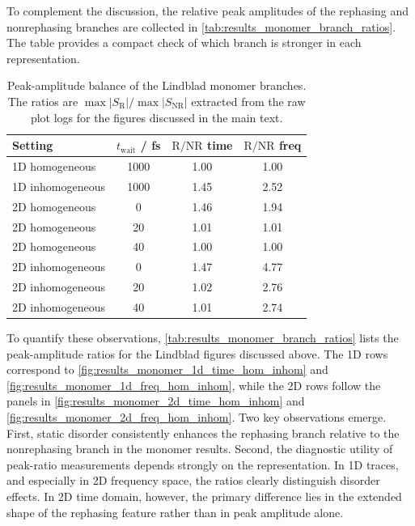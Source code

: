 To complement the discussion, the relative peak amplitudes of the rephasing and nonrephasing branches are collected in \autoref{tab:results_monomer_branch_ratios}. The table provides a compact check of which branch is stronger in each representation.
\begin{table}[htbp]
    \centering
    \small
    \caption{Peak-amplitude balance of the Lindblad monomer branches. The ratios are $\max|S_{\mathrm{R}}|/\max|S_{\mathrm{NR}}|$ extracted from the raw plot logs for the figures discussed in the main text.}
    \label{tab:results_monomer_branch_ratios}
    \begin{tabular}{@{}lccc@{}}
        \toprule
        Setting & $t_{\mathrm{wait}}$ / fs & $\mathrm{R}/\mathrm{NR}$ time & $\mathrm{R}/\mathrm{NR}$ freq \\
        \midrule
        1D homogeneous   & 1000 & 1.00 & 1.00 \\
        1D inhomogeneous & 1000 & 1.45 & 2.52 \\
        2D homogeneous   & 0  & 1.46 & 1.94 \\
        2D homogeneous   & 20 & 1.01 & 1.01 \\
        2D homogeneous   & 40 & 1.00 & 1.00 \\
        2D inhomogeneous & 0  & 1.47 & 4.77 \\
        2D inhomogeneous & 20 & 1.02 & 2.76 \\
        2D inhomogeneous & 40 & 1.01 & 2.74 \\
        \bottomrule
    \end{tabular}
\end{table}

To quantify these observations, \autoref{tab:results_monomer_branch_ratios} lists the peak-amplitude ratios for the Lindblad figures discussed above. The 1D rows correspond to \autoref{fig:results_monomer_1d_time_hom_inhom} and \autoref{fig:results_monomer_1d_freq_hom_inhom}, while the 2D rows follow the panels in \autoref{fig:results_monomer_2d_time_hom_inhom} and \autoref{fig:results_monomer_2d_freq_hom_inhom}. Two key observations emerge. First, static disorder consistently enhances the rephasing branch relative to the nonrephasing branch in the monomer results. Second, the diagnostic utility of peak-ratio measurements depends strongly on the representation. In 1D traces, and especially in 2D frequency space, the ratios clearly distinguish disorder effects. In 2D time domain, however, the primary difference lies in the extended shape of the rephasing feature rather than in peak amplitude alone.

